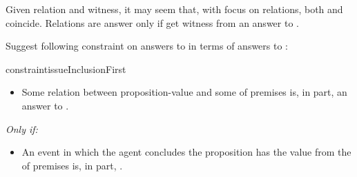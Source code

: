 \begin{note}
  Given relation and witness, it may seem that, with focus on relations, both \qWhy{} and \qHow{} coincide.
  Relations are answer \qWhy{} only if get witness from an answer to \qHow{}.

  Suggest following constraint on answers to \qWhy{} in terms of answers to \qHow{}:
  \begin{restatable}[\issueInclusion{}]{constraint}{issueInclusionFirst}
    \label{issue:why-inc-in-how}
    \mbox{ }
    \vspace{-\baselineskip}
    \begin{itemize}
    \item
      Some relation between proposition-value and some \poP{} of premises is, in part, an answer to \qWhy{}.
    \end{itemize}
    \emph{Only if:}
    \begin{itemize}
    \item
      An event in which the agent concludes the proposition has the value from the \poP{} of premises is, in part, \qHow{}.
    \end{itemize}
    \vspace{-\baselineskip}
  \end{restatable}
\end{note}

